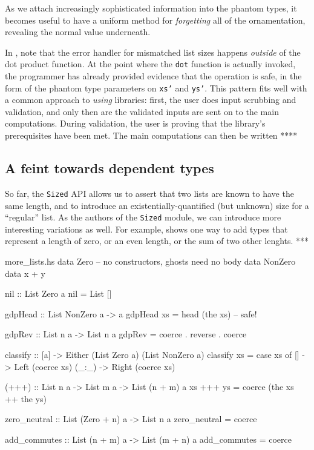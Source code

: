\documentclass[format=sigplan, review=false, screen=true]{acmart}
\begin{document}
As we attach increasingly sophisticated information into the phantom types, it becomes useful to
have a uniform method for \emph{forgetting} all of the ornamentation, revealing the normal
value underneath.

In , note that the error handler for mismatched list sizes happens
\emph{outside} of the dot product function. At the point where the \texttt{dot} function
is actually invoked, the programmer has already provided evidence that the operation is
safe, in the form of the phantom type parameters on \texttt{xs'} and \texttt{ys'}. This pattern
fits well with a common approach to \emph{using} libraries: first, the user does input scrubbing
and validation, and only then are the validated inputs are sent on to the main computations. 
During validation, the user is proving that the library's prerequisites have been met. The
main computations can then be written **** 

\subsection{A feint towards dependent types}
So far, the \texttt{Sized} API allows us to assert that two lists are known to have the same
length, and to introduce an existentially-quantified (but unknown) size for a ``regular'' list.
As the authors of the \texttt{Sized} module, we can introduce more interesting variations as
well. For example,  shows one way to add types that represent a length of
zero, or an even length, or the sum of two other lenghts. ***

\begin{filecontents*}{more_lists.hs}
data Zero    -- no constructors, ghosts need no body
data NonZero
data x + y

nil :: List Zero a
nil = List []

gdpHead :: List NonZero a -> a
gdpHead xs = head (the xs) -- safe!

gdpRev :: List n a -> List n a
gdpRev = coerce . reverse . coerce

classify :: [a] -> Either (List Zero a) (List NonZero a)
classify xs = case xs of
  []    -> Left  (coerce xs)
  (_:_) -> Right (coerce xs)
  
(+++) :: List n a -> List m a -> List (n + m) a
xs +++ ys = coerce (the xs ++ the ys)

zero_neutral :: List (Zero + n) a -> List n a
zero_neutral = coerce

add_commutes :: List (n + m) a -> List (m + n) a
add_commutes = coerce
\end{filecontents*}
\end{document}
